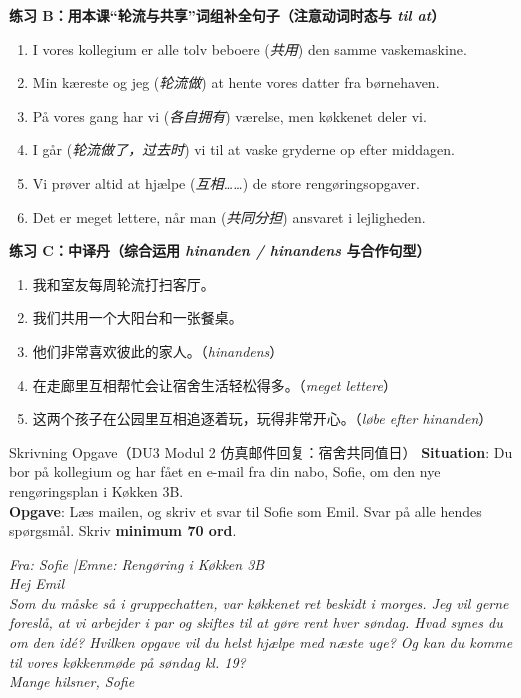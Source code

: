 \textbf{练习 B：用本课“轮流与共享”词组补全句子（注意动词时态与 \textit{til at}）}
\begin{enumerate}
  \item I vores kollegium er alle tolv beboere \underline{\hspace{2.8cm}} (\textit{共用}) den samme vaskemaskine.
  \item Min kæreste og jeg \underline{\hspace{3.2cm}} (\textit{轮流做}) at hente vores datter fra børnehaven.
  \item På vores gang har vi \underline{\hspace{2.8cm}} (\textit{各自拥有}) værelse, men køkkenet deler vi.
  \item I går \underline{\hspace{3.2cm}} (\textit{轮流做了，过去时}) vi til at vaske gryderne op efter middagen.
  \item Vi prøver altid at hjælpe \underline{\hspace{2.8cm}} (\textit{互相……}) de store rengøringsopgaver.
  \item Det er meget lettere, når man \underline{\hspace{2.8cm}} (\textit{共同分担}) ansvaret i lejligheden.
\end{enumerate}

\textbf{练习 C：中译丹（综合运用 \textit{hinanden / hinandens} 与合作句型）}
\begin{enumerate}
  \item 我和室友每周轮流打扫客厅。
  \item 我们共用一个大阳台和一张餐桌。
  \item 他们非常喜欢彼此的家人。（\textit{hinandens}）
  \item 在走廊里互相帮忙会让宿舍生活轻松得多。（\textit{meget lettere}）
  \item 这两个孩子在公园里互相追逐着玩，玩得非常开心。（\textit{løbe efter hinanden}）
\end{enumerate}


\begin{emailbox}{Skrivning Opgave（DU3 Modul 2 仿真邮件回复：宿舍共同值日）}
\textbf{Situation}: Du bor på kollegium og har fået en e-mail fra din nabo, Sofie, om den nye rengøringsplan i Køkken 3B.\\
\textbf{Opgave}: Læs mailen, og skriv et svar til Sofie som Emil. Svar på alle hendes spørgsmål. Skriv \textbf{minimum 70 ord}.

\vspace{0.3em}
\textit{Fra: Sofie \quad|\quad Emne: Rengøring i Køkken 3B\\
Hej Emil\\
Som du måske så i gruppechatten, var køkkenet ret beskidt i morges. Jeg vil gerne foreslå, at vi arbejder i par og skiftes til at gøre rent hver søndag. Hvad synes du om den idé? Hvilken opgave vil du helst hjælpe med næste uge? Og kan du komme til vores køkkenmøde på søndag kl. 19?\\
Mange hilsner, Sofie}
\end{emailbox}


